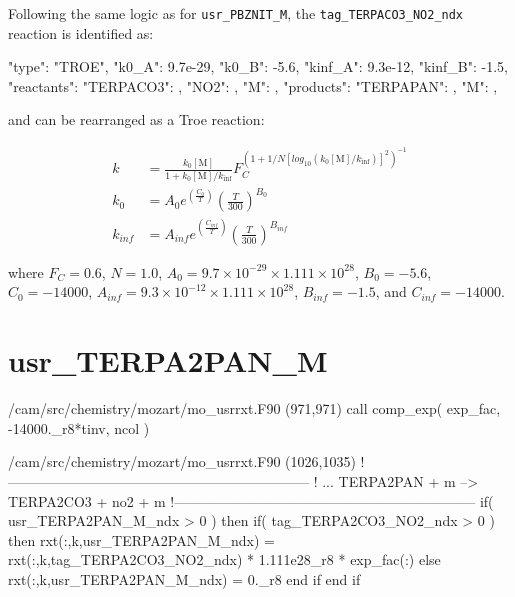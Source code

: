 \documentclass[titlepage]{article}
\begin{document}
Following the same logic as for \verb>usr_PBZNIT_M>, the \verb>tag_TERPACO3_NO2_ndx> reaction is identified as:

\begin{blockcode}
        {
          "type": "TROE",
          "k0_A": 9.7e-29,
          "k0_B": -5.6,
          "kinf_A": 9.3e-12,
          "kinf_B": -1.5,
          "reactants": {
            "TERPACO3": { },
            "NO2": { },
            "M": { }
          },
          "products": {
            "TERPAPAN": { },
            "M": { }
          }
        },
\end{blockcode}

\noindent and can be rearranged as a Troe reaction:

\begin{equation}
\begin{split}
k & = \frac{k_0[\mbox{M}]}{1+k_0[\mbox{M}]/k_{\inf}}F_C^{(1+1/N[log_{10}(k_0[\mbox{M}]/k_{\inf})]^2)^{-1}} \\
k_0 & = A_0 e^{\left( \frac{C_0}{T} \right)} \left( \frac{T}{300} \right)^{B_0} \\
k_{inf} & = A_{inf} e^{\left( \frac{C_{inf}}{T} \right)} \left( \frac{T}{300} \right)^{B_{inf}}
\end{split}
\end{equation}

\noindent where $F_C = 0.6$, $N = 1.0$, $A_0 = 9.7 \times 10^{-29} \times 1.111 \times 10^{28}$, $B_0 = -5.6$, $C_0 = -14000$, $A_{inf} = 9.3 \times 10^{-12} \times 1.111 \times 10^{28}$, $B_{inf} = -1.5$, and $C_{inf} = -14000$.


\section{usr\_TERPA2PAN\_M}

\begin{blockcode}[commandchars=\\\{\}]
\color{gray}/cam/src/chemistry/mozart/mo_usrrxt.F90 (971,971)
       call comp_exp( exp_fac, -14000._r8*tinv, ncol )
\end{blockcode}

\begin{blockcode}[commandchars=\\\{\}]
\color{gray}/cam/src/chemistry/mozart/mo_usrrxt.F90 (1026,1035)
!-----------------------------------------------------------------
!       ... TERPA2PAN + m --> TERPA2CO3 + no2 + m
!-----------------------------------------------------------------
       if( usr_TERPA2PAN_M_ndx > 0 ) then
          if( tag_TERPA2CO3_NO2_ndx > 0 ) then
             rxt(:,k,usr_TERPA2PAN_M_ndx) = rxt(:,k,tag_TERPA2CO3_NO2_ndx) * 1.111e28_r8 * exp_fac(:)
          else
             rxt(:,k,usr_TERPA2PAN_M_ndx) = 0._r8
          end if
       end if
\end{blockcode}
\end{document}

